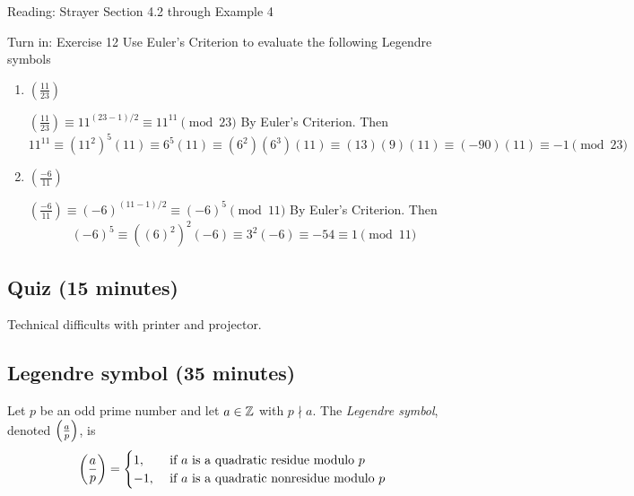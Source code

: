 \documentclass[letterpaper, 11 pt]{ximera}
\theoremstyle{definition}
\begin{document}
\begin{pre}
    \item[Reading:] Strayer Section 4.2 through Example 4
    \item[Turn in:] Exercise 12
     Use Euler's Criterion to evaluate the following Legendre symbols 
	\begin{enumerate}
 		\item $\left(\frac{11}{23}\right)$
		
		\begin{solution}
 			$\left(\frac{11}{23}\right)\equiv 11^{(23-1)/2}\equiv 11^{11}\pmod{23}$ By Euler's Criterion. Then
			\[11^{11}\equiv (11^{2})^{5}(11)\equiv 6^5(11)\equiv (6^2)(6^3)(11)\equiv (13)(9)(11)\equiv(-90)(11)\equiv -1\pmod{23}\]
		\end{solution}
		
		\item $\left(\frac{-6}{11}\right)$
		
		\begin{solution}
 			$\left(\frac{-6}{11}\right)\equiv (-6)^{(11-1)/2}\equiv (-6)^{5}\pmod{11}$ By Euler's Criterion. Then
			\[(-6)^{5}\equiv ((6)^{2})^{2}(-6)\equiv 3^2(-6)\equiv -54 \equiv 1\pmod{11}\]
		\end{solution}
	\end{enumerate}
 

    \end{pre}


\subsection{Quiz (15 minutes)}
Technical difficults with printer and projector.

\subsection{Legendre symbol (35 minutes)}

\begin{definition}\label{defn:legendre}
    Let $p$ be an odd prime number and let $a\in\mathbb Z$ with $p\nmid a$. The \emph{Legendre symbol}, denoted $\left(\frac{a}{p}\right)$, is
        \[
            \left(\frac{a}{p}\right)=
            \begin{cases}
                1, & \text{ if $a$ is a quadratic residue modulo $p$} \\
                -1, & \text{ if $a$ is a quadratic nonresidue modulo $p$} 
            \end{cases}
        \]
\end{definition}
\end{document}
